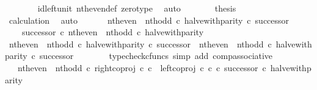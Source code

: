\begin{isabellebody}
\ \ \ \ \ \ \isamarkupfalse%
\ id{\isacharunderscore}{\kern0pt}left{\isacharunderscore}{\kern0pt}unit{}\ nth{\isacharunderscore}{\kern0pt}even{\isacharunderscore}{\kern0pt}def{}\ zero{\isacharunderscore}{\kern0pt}type\ \isamarkupfalse%
\ auto\isanewline
\ \ \ \ \isamarkupfalse%
\ \isamarkupfalse%
\ {\isacharquery}{\kern0pt}thesis\isanewline
\ \ \ \ \ \ \isamarkupfalse%
\ calculation\ \isamarkupfalse%
\ auto\isanewline
\ \ \isamarkupfalse%
\isanewline
\isanewline
\ \ \isamarkupfalse%
\ {\isachardoublequoteopen}{\isacharparenleft}{\kern0pt}nth{\isacharunderscore}{\kern0pt}even\ {\isasymamalg}\ nth{\isacharunderscore}{\kern0pt}odd\ {\isasymcirc}\isactrlsub c\ halve{\isacharunderscore}{\kern0pt}with{\isacharunderscore}{\kern0pt}parity{\isacharparenright}{\kern0pt}\ {\isasymcirc}\isactrlsub c\ successor\ {\isacharequal}{\kern0pt}\isanewline
\ \ \ \ successor\ {\isasymcirc}\isactrlsub c\ nth{\isacharunderscore}{\kern0pt}even\ {\isasymamalg}\ nth{\isacharunderscore}{\kern0pt}odd\ {\isasymcirc}\isactrlsub c\ halve{\isacharunderscore}{\kern0pt}with{\isacharunderscore}{\kern0pt}parity{\isachardoublequoteclose}\isanewline
\ \ \isamarkupfalse%
\ {\isacharminus}{\kern0pt}\isanewline
\ \ \ \ \isamarkupfalse%
\ {\isachardoublequoteopen}{\isacharparenleft}{\kern0pt}nth{\isacharunderscore}{\kern0pt}even\ {\isasymamalg}\ nth{\isacharunderscore}{\kern0pt}odd\ {\isasymcirc}\isactrlsub c\ halve{\isacharunderscore}{\kern0pt}with{\isacharunderscore}{\kern0pt}parity{\isacharparenright}{\kern0pt}\ {\isasymcirc}\isactrlsub c\ successor\ {\isacharequal}{\kern0pt}\ nth{\isacharunderscore}{\kern0pt}even\ {\isasymamalg}\ nth{\isacharunderscore}{\kern0pt}odd\ {\isasymcirc}\isactrlsub c\ halve{\isacharunderscore}{\kern0pt}with{\isacharunderscore}{\kern0pt}parity\ {\isasymcirc}\isactrlsub c\ successor{\isachardoublequoteclose}\isanewline
\ \ \ \ \ \ \isamarkupfalse%
\ {\isacharparenleft}{\kern0pt}typecheck{\isacharunderscore}{\kern0pt}cfuncs{\isacharcomma}{\kern0pt}\ simp\ add{\isacharcolon}{\kern0pt}\ comp{\isacharunderscore}{\kern0pt}associative{}{\isacharparenright}{\kern0pt}\isanewline
\ \ \ \ \isamarkupfalse%
\ \isamarkupfalse%
\ {\isachardoublequoteopen}{\isachardot}{\kern0pt}{\isachardot}{\kern0pt}{\isachardot}{\kern0pt}\ {\isacharequal}{\kern0pt}\ nth{\isacharunderscore}{\kern0pt}even\ {\isasymamalg}\ nth{\isacharunderscore}{\kern0pt}odd\ {\isasymcirc}\isactrlsub c\ right{\isacharunderscore}{\kern0pt}coproj\ {\isasymnat}\isactrlsub c\ {\isasymnat}\isactrlsub c\ {\isasymamalg}\ {\isacharparenleft}{\kern0pt}left{\isacharunderscore}{\kern0pt}coproj\ {\isasymnat}\isactrlsub c\ {\isasymnat}\isactrlsub c\ {\isasymcirc}\isactrlsub c\ successor{\isacharparenright}{\kern0pt}\ {\isasymcirc}\isactrlsub c\ halve{\isacharunderscore}{\kern0pt}with{\isacharunderscore}{\kern0pt}parity{\isachardoublequoteclose}\isanewline

\end{isabellebody}
